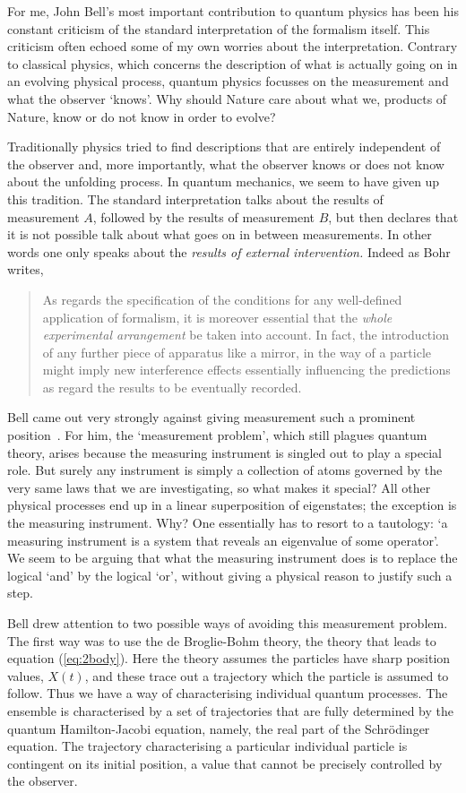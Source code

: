 \documentclass[11pt]{article}
\begin{document}
 For me, John Bell's most important contribution to quantum physics has been his constant criticism of the standard interpretation of the formalism itself.  This criticism often echoed some of my own worries about the interpretation.  Contrary to classical physics, which concerns the description of what is actually going on in an evolving  physical process, quantum physics focusses on the measurement and what the observer `knows'.  Why should Nature care about what we, products of Nature, know or do not know in order to evolve?  
 
Traditionally physics tried to find descriptions that are entirely independent of the observer and, more importantly, what the observer knows or does not know about the unfolding process.  In quantum mechanics, we seem to have given up this tradition.  The standard interpretation talks about the results of measurement $A$, followed by the results of measurement $B$, but then declares that it is not possible talk about what goes on in between measurements.  In other words one only speaks about the {\em results of external intervention.}  Indeed as Bohr~\cite{nb61} writes,
\begin{quote}
As regards the specification of the conditions for any well-defined application of formalism, it is moreover essential that the {\em whole experimental arrangement} be taken into account.  In fact, the introduction of any further piece of apparatus like a mirror, in the way of a particle might imply new interference effects essentially influencing the predictions as regard the results to be eventually recorded.
\end{quote}
Bell came out very strongly against giving measurement such a prominent position~\cite{jb90}.
For him, the `measurement problem', which still plagues quantum theory, arises because the measuring instrument is singled out to play a special role. But surely any instrument is simply a collection of atoms governed by the very same laws that  we are investigating, so what makes it special?   All other physical processes end up in a linear superposition of eigenstates; the exception is the measuring instrument.  Why?
One essentially has to resort to a tautology:    `a measuring instrument is a system that reveals an eigenvalue of some operator'.  We seem to be arguing that what the measuring instrument does is to replace the logical `and' by the logical `or', without giving a physical reason to justify such a step.

Bell drew attention to two possible ways of avoiding this measurement problem.  The first way was to use the de Broglie-Bohm theory, the theory that leads to equation (\ref{eq:2body}).  Here the theory assumes the particles have sharp position values, $X(t)$, and these trace out a trajectory which the particle is assumed to follow.  Thus we have a way of characterising individual quantum processes.  The ensemble is characterised by a set of trajectories that are fully determined by the quantum  Hamilton-Jacobi equation, namely, the real part of the Schr\"{o}dinger equation.  The trajectory characterising a particular individual particle  is contingent on its initial position, a value that cannot be precisely controlled by the observer.
\end{document}
